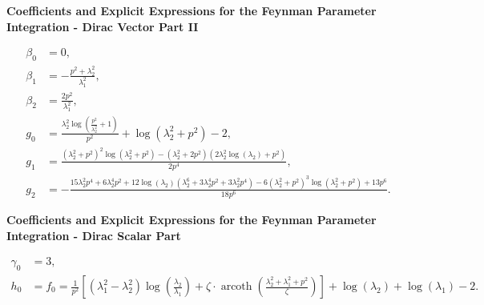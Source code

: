 \pagebreak

\newcommand{\col}[1]{\label{eq:coeff_A_#1}\qquad\qquad}
\newenvironment{titledeqns}[1]{\large\bfseries{#1}
}{}

\newcommand{\tunedvs}{3pt}

\makeatletter 
\def\leqno{\tagsleft@true}\def\reqno{\tagsleft@false} 
\makeatother 

\leqno

\hspace{0pt}
\vspace{2em}
\begin{titledeqns}{Coefficients and Explicit Expressions for the Feynman Parameter Integration - Dirac Vector Part II}
\begin{align}
 \beta_0 &= 0,  \\[1em]
 \beta_1 &= -\frac{p^2+\lambda_2^2}{\lambda_1^2}, \\[1em]
 \beta_2 &= \frac{2p^2}{\lambda_1^2}, \\[3em]
 g_0 &= \frac{\lambda_2^2 \operatorname{log}\left(\frac{p^2}{\lambda_2^2}+1\right)}{p^2}+ \operatorname{log}\left(\lambda_2^2+p^2\right)-2, \\[1em]
 g_1 &=\frac{\left(\lambda_2^2+p^2\right)^2  \operatorname{log} \left(\lambda_2^2+p^2\right)-\left(\lambda_2^2+2 p^2\right) \left(2 \lambda_2^2  \operatorname{log} (\lambda_2)+p^2\right)}{2 p^4},\\[1em]
 g_2 &= -\frac{15 \lambda_2^2 p^4+6 \lambda_2^4 p^2+12  \operatorname{log} (\lambda_2) \left(\lambda_2^6+3 \lambda_2^4 p^2+3 \lambda_2^2 p^4\right)-6 \left(\lambda_2^2+p^2\right)^3  \operatorname{log} \left(\lambda_2^2+p^2\right)+13 p^6}{18 p^6}. \end{align}
\vspace{2em}
\end{titledeqns}

\begin{titledeqns}{Coefficients and Explicit Expressions for the Feynman Parameter Integration - Dirac Scalar Part}
\begin{align}
 \gamma_0 &= 3, \\[1em]
 h_0 &= f_0 = \frac{1}{p^2}\left[\left(\lambda_1^2-\lambda_2^2\right)  \operatorname{log} \left(\frac{\lambda_2}{\lambda_1}\right)+\zeta\cdot \operatorname{arcoth}\left(\frac{\lambda_2^2+\lambda_1^2+p^2}{\zeta}\right)\right] + \operatorname{log} (\lambda_2)+ \operatorname{log} (\lambda_1)-2. 
\end{align}
\end{titledeqns}

\reqno